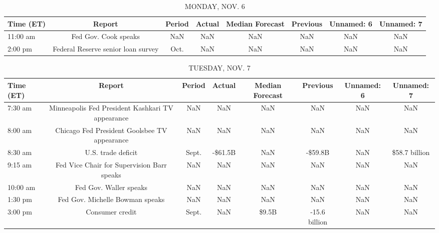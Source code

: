 \documentclass{article}%
\begin{document}
%
\normalsize%


\begin{table}[htbp]%
\caption{MONDAY, NOV. 6}%
\centering%
\begin{adjustbox}{width=1\textwidth}%
\begin{tabular}{lccccccc}
\toprule
Time (ET) &                             Report & Period & Actual & Median Forecast & Previous & Unnamed: 6 & Unnamed: 7 \\
\midrule
 11:00 am &               Fed Gov. Cook speaks &    NaN &    NaN &             NaN &      NaN &        NaN &        NaN \\
  2:00 pm & Federal Reserve senior loan survey &   Oct. &    NaN &             NaN &      NaN &        NaN &        NaN \\
\bottomrule
\end{tabular}
%
\end{adjustbox}%
\end{table}

%


\begin{table}[htbp]%
\caption{TUESDAY, NOV. 7}%
\centering%
\begin{adjustbox}{width=1\textwidth}%
\begin{tabular}{lccccccc}
\toprule
Time (ET) &                                           Report & Period &  Actual & Median Forecast &      Previous & Unnamed: 6 &    Unnamed: 7 \\
\midrule
  7:30 am & Minneapolis Fed President Kashkari TV appearance &    NaN &     NaN &             NaN &           NaN &        NaN &           NaN \\
  8:00 am &     Chicago Fed President Goolsbee TV appearance &    NaN &     NaN &             NaN &           NaN &        NaN &           NaN \\
  8:30 am &                               U.S. trade deficit &  Sept. & -\$61.5B &             NaN &       -\$59.8B &        NaN & \$58.7 billion \\
  9:15 am &       Fed Vice Chair for Supervision Barr speaks &    NaN &     NaN &             NaN &           NaN &        NaN &           NaN \\
 10:00 am &                           Fed Gov. Waller speaks &    NaN &     NaN &             NaN &           NaN &        NaN &           NaN \\
  1:30 pm &                  Fed Gov. Michelle Bowman speaks &    NaN &     NaN &             NaN &           NaN &        NaN &           NaN \\
  3:00 pm &                                  Consumer credit &  Sept. &     NaN &           \$9.5B & -15.6 billion &        NaN &           NaN \\
\bottomrule
\end{tabular}
%
\end{adjustbox}%
\end{table}
\end{document}
